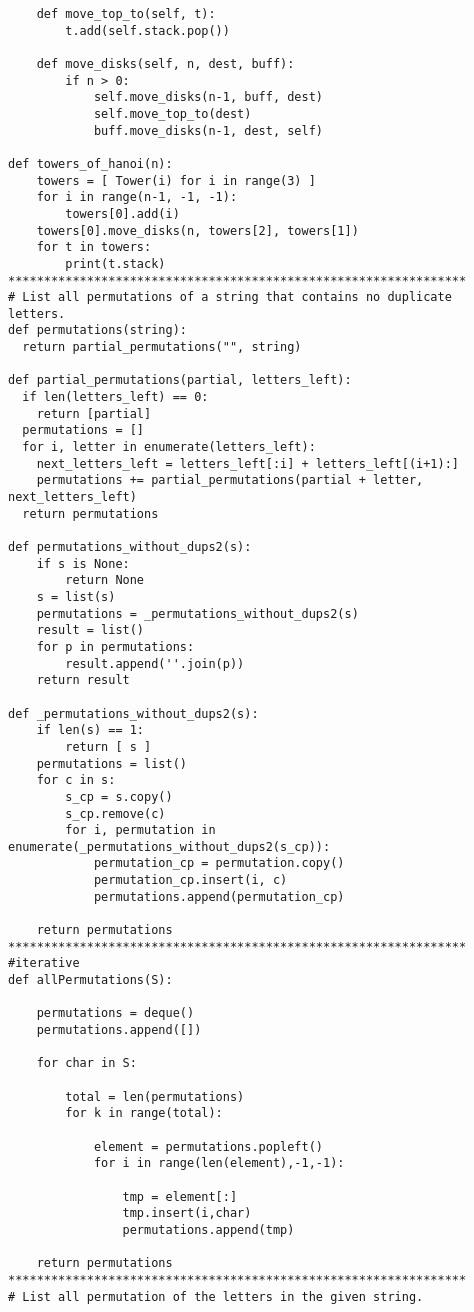 \documentclass[12pt]{article}
\begin{document}
\begin{lstlisting}
    def move_top_to(self, t):
        t.add(self.stack.pop())

    def move_disks(self, n, dest, buff):
        if n > 0:
            self.move_disks(n-1, buff, dest)
            self.move_top_to(dest)
            buff.move_disks(n-1, dest, self)

def towers_of_hanoi(n):
    towers = [ Tower(i) for i in range(3) ]
    for i in range(n-1, -1, -1):
        towers[0].add(i)
    towers[0].move_disks(n, towers[2], towers[1])
    for t in towers:
        print(t.stack)
****************************************************************
# List all permutations of a string that contains no duplicate letters.
def permutations(string):
  return partial_permutations("", string)

def partial_permutations(partial, letters_left):
  if len(letters_left) == 0:
    return [partial]
  permutations = []
  for i, letter in enumerate(letters_left):
    next_letters_left = letters_left[:i] + letters_left[(i+1):]
    permutations += partial_permutations(partial + letter, next_letters_left)
  return permutations

def permutations_without_dups2(s):
    if s is None:
        return None
    s = list(s)
    permutations = _permutations_without_dups2(s)
    result = list()
    for p in permutations:
        result.append(''.join(p))
    return result

def _permutations_without_dups2(s):
    if len(s) == 1:
        return [ s ]
    permutations = list()
    for c in s:
        s_cp = s.copy()
        s_cp.remove(c)
        for i, permutation in enumerate(_permutations_without_dups2(s_cp)):
            permutation_cp = permutation.copy()
            permutation_cp.insert(i, c)
            permutations.append(permutation_cp)

    return permutations
****************************************************************
#iterative
def allPermutations(S):

	permutations = deque()
	permutations.append([])

	for char in S:

		total = len(permutations)
		for k in range(total):

			element = permutations.popleft()
			for i in range(len(element),-1,-1):

				tmp = element[:]
				tmp.insert(i,char)
				permutations.append(tmp)

	return permutations
****************************************************************
# List all permutation of the letters in the given string.


\end{lstlisting}
\end{document}
